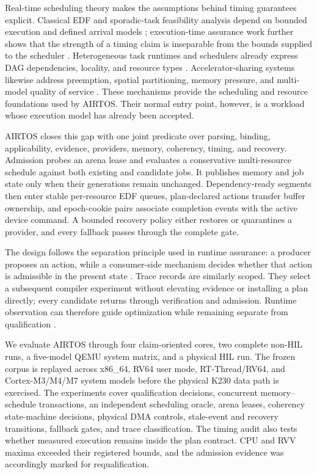 \documentclass[lettersize,journal]{IEEEtran}
\begin{document}
Real-time scheduling theory makes the assumptions behind timing guarantees
explicit. Classical EDF and sporadic-task feasibility analysis depend on
bounded execution and defined arrival models
\cite{liu1973scheduling,baruah1990preemptively}; execution-time assurance work
further shows that the strength of a timing claim is inseparable from the
bounds supplied to the scheduler \cite{vestal2007preemptive}. Heterogeneous
task runtimes and schedulers already express DAG dependencies, locality, and
resource types \cite{topcuoglu2002performanceeffective,augonnet2011starpu,
bauer2012legion,rossbach2011ptask,lin2022typeaware}. Accelerator-sharing
systems likewise address preemption, spatial partitioning, memory pressure,
and multi-model quality of service
\cite{choi2020prema,ghodrati2020planaria,kim2023moca,kim2023dream}. These
mechanisms provide the scheduling and resource foundations used by AIRTOS.
Their normal entry point, however, is a workload whose execution model has
already been accepted.

AIRTOS closes this gap with one joint predicate over parsing, binding,
applicability, evidence, providers, memory, coherency, timing, and recovery.
Admission probes an arena lease and evaluates a conservative multi-resource
schedule against both existing and candidate jobs. It publishes memory and
job state only when their generations remain unchanged. Dependency-ready
segments then enter stable per-resource EDF queues, plan-declared actions
transfer buffer ownership, and epoch-cookie pairs associate completion events
with the active device command. A bounded recovery policy either restores or
quarantines a provider, and every fallback passes through the complete gate.

The design follows the separation principle used in runtime assurance: a
producer proposes an action, while a consumer-side mechanism decides whether
that action is admissible in the present state
\cite{seto1998simplex,hobbs2023runtime}. Trace records are similarly
scoped. They select a subsequent compiler experiment without elevating
evidence or installing a plan directly; every candidate returns through
verification and admission. Runtime observation can therefore guide
optimization while remaining separate from qualification
\cite{leucker2009brief}.

We evaluate AIRTOS through four claim-oriented cores, two complete non-HIL
runs, a five-model QEMU system matrix, and a physical HIL run. The frozen
corpus is replayed across x86\_64, RV64 user mode, RT-Thread/RV64, and
Cortex-M3/M4/M7 system models before the physical K230 data path is exercised.
The experiments cover qualification decisions, concurrent memory--schedule
transactions, an independent scheduling oracle, arena leases, coherency
state-machine decisions, physical DMA controls, stale-event and recovery
transitions, fallback gates, and trace classification. The timing audit also
tests whether measured execution remains inside the plan contract. CPU and RVV
maxima exceeded their registered bounds, and the admission evidence was
accordingly marked for requalification.
\end{document}
